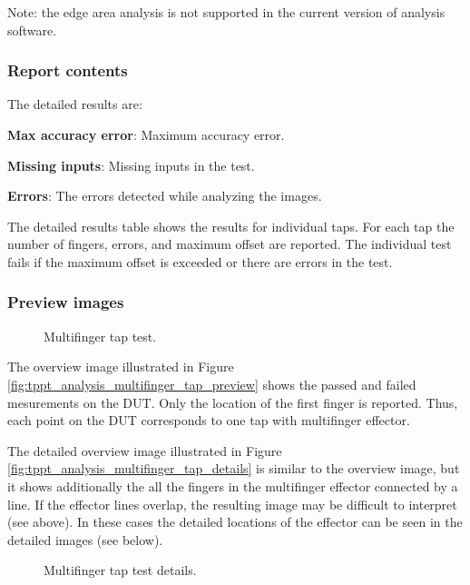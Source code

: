 Note: the edge area analysis is not supported in the current version of analysis software.

\subsubsection{Report contents}

The detailed results are:

\textbf{Max accuracy error}: Maximum accuracy error. 

\textbf{Missing inputs}: Missing inputs in the test. 

\textbf{Errors}: The errors detected while analyzing the images.

The detailed results table shows the results for individual taps. For each tap the number of fingers, errors, and maximum offset are reported. The individual test fails if the maximum offset is exceeded or there are errors in the test.

\subsubsection{Preview images}

\begin{figure}[!h]
	\caption{Multifinger tap test.}
\end{figure}

The overview image illustrated in Figure \ref{fig:tppt_analysis_multifinger_tap_preview} shows the passed and failed mesurements on the DUT. Only the location of the first finger is reported. Thus, each point on the DUT corresponds to one tap with multifinger effector.

The detailed overview image illustrated in Figure \ref{fig:tppt_analysis_multifinger_tap_details} is similar to the overview image, but it shows additionally the all the fingers in the multifinger effector connected by a line. If the effector lines overlap, the resulting image may be difficult to interpret (see above). In these cases the detailed locations of the effector can be seen in the detailed images (see below).

\begin{figure}[!h]
	\caption{Multifinger tap test details.}
\end{figure}

